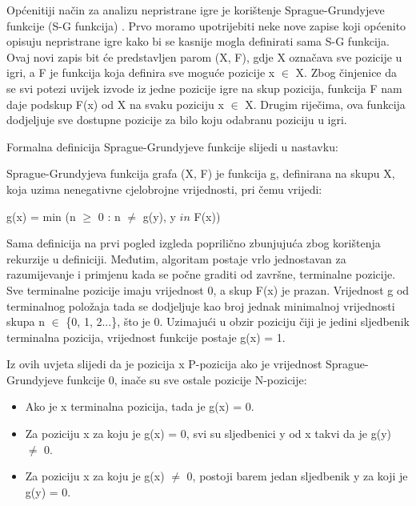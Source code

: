 Općenitiji način za analizu nepristrane igre je korištenje Sprague-Grundyjeve funkcije (S-G funkcija)\cite{1939mathematicsandgames} \cite{1973ubermathematischekampfspiele}. Prvo moramo upotrijebiti neke nove zapise koji općenito opisuju nepristrane igre kako bi se kasnije mogla definirati sama S-G funkcija. Ovaj novi zapis bit će predstavljen parom (X, F), gdje X označava sve pozicije u igri, a F je funkcija koja definira sve moguće pozicije x $\in$ X. Zbog činjenice da se svi potezi uvijek izvode iz jedne pozicije igre na skup pozicija, funkcija F nam daje podskup F(x) od X na svaku poziciju x $\in$ X. Drugim riječima, ova funkcija dodjeljuje sve dostupne pozicije za bilo koju odabranu poziciju u igri.

Formalna definicija Sprague-Grundyjeve funkcije slijedi u nastavku:

\begin{definition}\cite{2008gametheoryferguson}
    Sprague-Grundyjeva funkcija grafa (X, F) je funkcija g, definirana na skupu X, koja uzima nenegativne cjelobrojne vrijednosti, pri čemu vrijedi:

\begin{center}
    g(x) = min (n $\geq$ 0 : n $\neq$ g(y), y $in$ F(x))
\end{center}

\end{definition}

Sama definicija na prvi pogled izgleda poprilično zbunjujuća zbog korištenja rekurzije u definiciji. Međutim, algoritam postaje vrlo jednostavan za razumijevanje i primjenu kada se počne graditi od završne, terminalne pozicije. Sve terminalne pozicije imaju vrijednost 0, a skup F(x) je prazan. Vrijednost g od terminalnog položaja tada se dodjeljuje kao broj jednak minimalnoj vrijednosti skupa n $\in$ \{0, 1, 2...\}, što je 0. Uzimajući u obzir poziciju čiji je jedini sljedbenik terminalna pozicija, vrijednost funkcije postaje g(x) = 1.

Iz ovih uvjeta slijedi da je pozicija x P-pozicija ako je vrijednost Sprague-Grundyjeve funkcije 0, inače su sve ostale pozicije N-pozicije:

\begin{itemize}
    \item Ako je x terminalna pozicija, tada je g(x) = 0.
    \item Za poziciju x za koju je g(x) = 0, svi su sljedbenici y od x takvi da je g(y) $\neq$ 0.
    \item Za poziciju x za koju je g(x) $\neq$ 0, postoji barem jedan sljedbenik y za koji je g(y) = 0.
\end{itemize}

